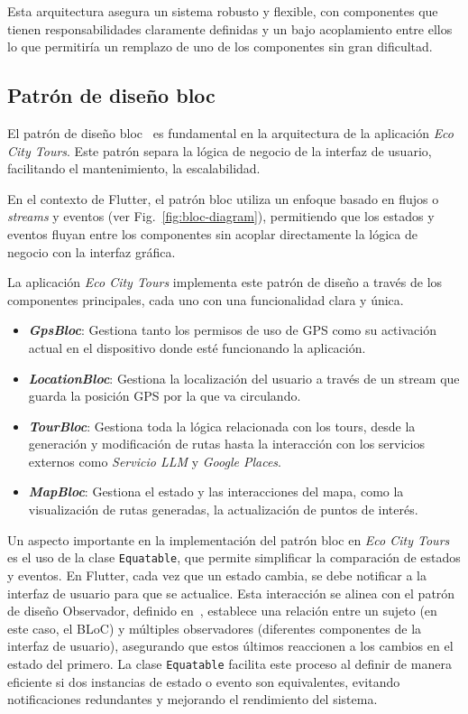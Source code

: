 Esta arquitectura asegura un sistema robusto y flexible, con componentes que tienen responsabilidades claramente definidas y un bajo acoplamiento entre ellos lo que permitiría un remplazo de uno de los componentes sin gran dificultad.


\subsection{Patrón de diseño \acrfull{bloc}}
El patrón de diseño \acrshort{bloc}~\cite{flutter_bloc} es fundamental en la arquitectura de la aplicación \textit{Eco City Tours}. Este patrón separa la lógica de negocio de la interfaz de usuario, facilitando el mantenimiento, la escalabilidad.

En el contexto de Flutter, el patrón \acrlong{bloc} utiliza un enfoque basado en flujos o \textit{streams} y eventos (ver Fig.~\ref{fig:bloc-diagram}), permitiendo que los estados y eventos fluyan entre los componentes sin acoplar directamente la lógica de negocio con la interfaz gráfica. 

La aplicación \textit{Eco City Tours} implementa este patrón de diseño a través de los componentes principales, cada uno con una funcionalidad clara y única.
\begin{itemize}
	\item \textbf{\textit{GpsBloc}}: Gestiona tanto los permisos de uso de GPS como su activación actual en el dispositivo donde esté funcionando la aplicación.
	\item \textbf{\textit{LocationBloc}}: Gestiona la localización del usuario a través de un stream que guarda la posición GPS por la que va circulando.
	\item \textbf{\textit{TourBloc}}: Gestiona toda la lógica relacionada con los tours, desde la generación y modificación de rutas hasta la interacción con los servicios externos como \textit{Servicio LLM} y \textit{Google Places}.
	\item \textbf{\textit{MapBloc}}: Gestiona el estado y las interacciones del mapa, como la visualización de rutas generadas, la actualización de puntos de interés.
\end{itemize}

Un aspecto importante en la implementación del patrón \acrshort{bloc} en \textit{Eco City Tours} es el uso de la clase \texttt{Equatable}, que permite simplificar la comparación de estados y eventos. En Flutter, cada vez que un estado cambia, se debe notificar a la interfaz de usuario para que se actualice. Esta interacción se alinea con el patrón de diseño Observador, definido en~\cite{gamma2002patrones}, establece una relación entre un sujeto (en este caso, el BLoC) y múltiples observadores (diferentes componentes de la interfaz de usuario), asegurando que estos últimos reaccionen a los cambios en el estado del primero. La clase \texttt{Equatable} facilita este proceso al definir de manera eficiente si dos instancias de estado o evento son equivalentes, evitando notificaciones redundantes y mejorando el rendimiento del sistema.

